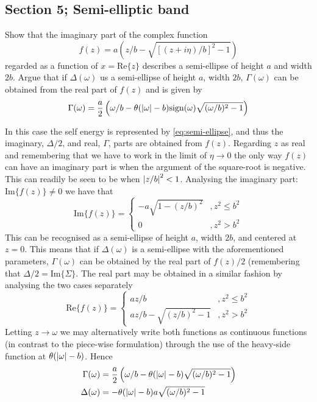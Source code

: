 \subsection{Section 5; Semi-elliptic band}
\begin{exercise}
Show that the imaginary part of the complex function
\begin{equation}\label{eq:semi-ellipse}
    f(z) = a(z/b - \sqrt{[(z+i\eta)/b]^2 - 1})
\end{equation}
regarded as a function of $x = \mathrm{Re}\{z\}$ describes a semi-ellipse of height $a$ and width $2b$. Argue that if $\Delta(\omega)$ us a semi-ellipse of height $a$, width $2b$, $\Gamma(\omega)$ can be obtained from the real part of $f(z)$ and is given by
\begin{equation}\label{eq:Gamma-SE}
    \Gamma(\omega) = \dfrac{a}{2}\left(\omega/b - \theta(\abs{\omega}-b)\mathrm{sign}(\omega)\sqrt{(\omega/b)^2-1} \right)
\end{equation}
\end{exercise}
\begin{solution}
In this case the self energy is represented by \eqref{eq:semi-ellipse}, and thus the imaginary, $\Delta/2$, and real, $\Gamma$, parts are obtained from $f(z)$. Regarding $z$ as real and remembering that we have to work in the limit of $\eta \rightarrow 0$ the only way $f(z)$ can have an imaginary part is when the argument of the square-root is negative. This can readily be seen to be when $\abs{z/b}^2 < 1$. Analysing the imaginary part: $\mathrm{Im}\{f(z)\} \neq 0$ we have that
\begin{equation}
    \mathrm{Im}\{f(z)\} = \begin{cases} -a\sqrt{1 - (z/b)^2} &, z^2 \leq b^2 \\ 0 &, z^2 > b^2 \end{cases}
\end{equation}
This can be recognised as a semi-ellipse of height $a$, width $2b$, and centered at $z = 0$. This means that if $\Delta(\omega)$ is a semi-ellipse with the aforementioned parameters, $\Gamma(\omega)$ can be obtained by the real part of $f(z)/2$ (remembering that $\Delta/2 = \mathrm{Im}\{\Sigma\}$. The real part may be obtained in a similar fashion by analysing the two cases separately
\begin{equation}
    \mathrm{Re}\{f(z)\} = \begin{cases} az/b &, z^2 \leq b^2 \\ az/b - \sqrt{(z/b)^2-1} &, z^2 > b^2 \end{cases}
\end{equation}
Letting $z \rightarrow \omega$ we may alternatively write both functions as continuous functions (in contrast to the piece-wise formulation) through the use of the heavy-side function at $\theta(\abs{\omega} - b)$. Hence
\begin{align}\label{eq:semi_gamma}
    \Gamma(\omega) &= \dfrac{a}{2}\left(\omega/b - \theta(\abs{\omega}-b)\sqrt{(\omega/b)^2-1}\right) \\
    \Delta(\omega) &= -\theta(\abs{\omega}-b)a\sqrt{(\omega/b)^2-1} \label{eq:semi_delta}
\end{align}

\end{solution}

